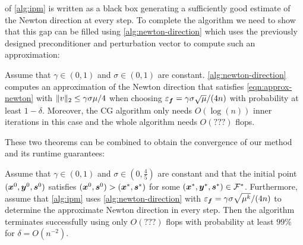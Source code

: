  of \cref{alg:ipm} is written as a black box generating a sufficiently good estimate of the Newton direction at every step.
To complete the algorithm we need to show that this gap can be filled using \cref{alg:newton-direction} which uses the previously designed preconditioner and perturbation vector to compute such an approximation:
\begin{theorem}
Assume that \(\gamma \in (0, 1)\) and \(\sigma \in (0, 1)\) are constant. \cref{alg:newton-direction} computes an approximation of the Newton direction that satisfies \cref{eqn:approx-newton} with \(\lVert v \rVert_2 \leq \gamma \sigma \mu / 4\) when choosing \(\varepsilon_{\bm{f}} = \gamma \sigma \sqrt{\mu} / (4 n)\) with probability at least \(1 - \delta\).
Moreover, the CG algorithm only needs \(O(\log(n))\) inner iterations in this case and the whole algorithm needs \(O(???)\) flops.
\end{theorem}

These two theorems can be combined to obtain the convergence of our method and its runtime guarantees:
\begin{theorem}
Assume that \(\gamma \in (0, 1)\) and \(\sigma \in (0, \frac{4}{5})\) are constant and that the initial point \((\bm{x}^0, \bm{y}^0, \bm{s}^0)\) satisfies \((\bm{x}^0, \bm{s}^0) > (\bm{x}^*, \bm{s}^*)\) for some \((\bm{x}^*, \bm{y}^*, \bm{s}^*) \in \mathcal{F}^*\).
Furthermore, assume that \cref{alg:ipm} uses \cref{alg:newton-direction} with \(\varepsilon_{\bm{f}} = \gamma \sigma \sqrt{\mu^k} / (4 n)\) to determine the approximate Newton direction in every step.
Then the algorithm terminates successfully using only \(O(???)\) flops with probability at least \(99\%\) for \(\delta = O(n^{-2})\).
\end{theorem}
